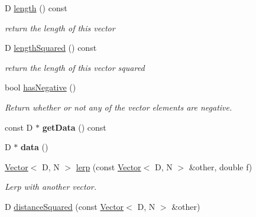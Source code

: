 \begin{DoxyCompactItemize}
D \mbox{\hyperlink{classrev_1_1_vector_a48fbca38fa246e549e889aeed4dab8a2}{length}} () const
\begin{DoxyCompactList}\small\item\em return the length of this vector \end{DoxyCompactList}\item 
\mbox{\label{classrev_1_1_vector_ac708c46fc7f21f72e0a3535e4628f99f}} 
D \mbox{\hyperlink{classrev_1_1_vector_ac708c46fc7f21f72e0a3535e4628f99f}{length\+Squared}} () const
\begin{DoxyCompactList}\small\item\em return the length of this vector squared \end{DoxyCompactList}\item 
\mbox{\label{classrev_1_1_vector_ae0559739c9280cb0239223e084a1bfd7}} 
bool \mbox{\hyperlink{classrev_1_1_vector_ae0559739c9280cb0239223e084a1bfd7}{has\+Negative}} ()
\begin{DoxyCompactList}\small\item\em Return whether or not any of the vector elements are negative. \end{DoxyCompactList}\item 
\mbox{\label{classrev_1_1_vector_a33796ac6ab147e4b1ccb65c3c9b4bba4}} 
const D $\ast$ {\bfseries get\+Data} () const
\item 
\mbox{\label{classrev_1_1_vector_af204ff4026281b530856fa6521b40c10}} 
D $\ast$ {\bfseries data} ()
\item 
\mbox{\label{classrev_1_1_vector_ab4be69161a119fd1bb0bb1f500b18f3e}} 
\mbox{\hyperlink{classrev_1_1_vector}{Vector}}$<$ D, N $>$ \mbox{\hyperlink{classrev_1_1_vector_ab4be69161a119fd1bb0bb1f500b18f3e}{lerp}} (const \mbox{\hyperlink{classrev_1_1_vector}{Vector}}$<$ D, N $>$ \&other, double f)
\begin{DoxyCompactList}\small\item\em Lerp with another vector. \end{DoxyCompactList}\item 
\mbox{\label{classrev_1_1_vector_a84128f659a106f7431d4f11780329ed8}} 
D \mbox{\hyperlink{classrev_1_1_vector_a84128f659a106f7431d4f11780329ed8}{distance\+Squared}} (const \mbox{\hyperlink{classrev_1_1_vector}{Vector}}$<$ D, N $>$ \&other)

\end{DoxyCompactItemize}
